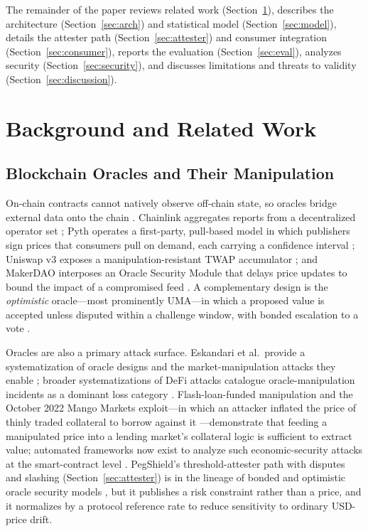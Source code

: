 \documentclass[aps,prx,reprint,nofootinbib,longbibliography]{revtex4-2}
\begin{document}
The remainder of the paper reviews related work (Section~\ref{sec:related}),
describes the architecture (Section~\ref{sec:arch}) and statistical model
(Section~\ref{sec:model}), details the attester path (Section~\ref{sec:attester})
and consumer integration (Section~\ref{sec:consumer}), reports the evaluation
(Section~\ref{sec:eval}), analyzes security (Section~\ref{sec:security}), and
discusses limitations and threats to validity (Section~\ref{sec:discussion}).

\section{Background and Related Work}
\label{sec:related}

\subsection{Blockchain Oracles and Their Manipulation}

On-chain contracts cannot natively observe off-chain state, so oracles bridge
external data onto the chain \cite{beniiche2020study}. Chainlink aggregates reports from a decentralized
operator set \cite{breidenbach2021chainlink}; Pyth operates a first-party,
pull-based model in which publishers sign prices that consumers pull on demand,
each carrying a confidence interval \cite{pyth2022whitepaper,pyth_hermes}; Uniswap
v3 exposes a manipulation-resistant TWAP accumulator \cite{adams2021uniswapv3}; and
MakerDAO interposes an Oracle Security Module that delays price updates to bound
the impact of a compromised feed \cite{makerdao_oracle_module}. A complementary
design is the \emph{optimistic} oracle---most prominently UMA---in which a proposed
value is accepted unless disputed within a challenge window, with bonded
escalation to a vote \cite{uma_optimistic_oracle}.

Oracles are also a primary attack surface. Eskandari et al.\ provide a systematization
of oracle designs and the market-manipulation attacks they enable
\cite{eskandari2021sok}; broader systematizations of DeFi attacks catalogue
oracle-manipulation incidents as a dominant loss category
\cite{zhou2023sok}. Flash-loan-funded manipulation
\cite{qin2021flashloans,daian2020flashboys} and the October 2022 Mango Markets
exploit---in which an attacker inflated the price of thinly traded collateral to
borrow against it \cite{rekt_mango_2022}---demonstrate that feeding a manipulated
price into a lending market's collateral logic is sufficient to extract value;
automated frameworks now exist to analyze such economic-security attacks at the
smart-contract level \cite{babel2023clockwork}.
PegShield's threshold-attester path with disputes and slashing
(Section~\ref{sec:attester}) is in the lineage of bonded and optimistic oracle
security models \cite{uma_optimistic_oracle,breidenbach2021chainlink}, but it
publishes a risk constraint rather than a price, and it normalizes by a protocol
reference rate to reduce sensitivity to ordinary USD-price drift.
\end{document}
